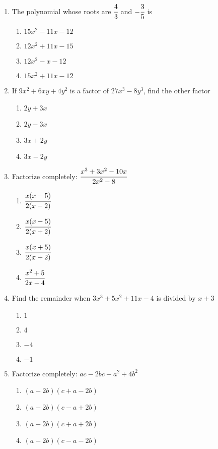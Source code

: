 \begin{multicols}{2}
\begin{enumerate}[label={\arabic*.}]
    \item The polynomial whose roots are \(\cfrac{4}{3}\) and \(-{\cfrac{3}{5}}\) is
      \begin{enumerate}[label={\Alph*.}]
        \item \(15x^2 - 11x -12 \)
        \item \(12x^2 + 11x -15\)
        \item \(12x^2 - x -12\)
        \item \(15x^2 + 11x -12\)
      \end{enumerate}
    \item If \(9x^2 + 6xy + 4y^2\) is a factor of \(27x^3 - 8y^3\), find the other factor
      \begin{enumerate}[label={\Alph*.}]
        \item \(2y + 3x\)
        \item \(2y - 3x\)
        \item \(3x + 2y\)
        \item \(3x - 2y\)
      \end{enumerate}
    \item Factorize completely: \(\cfrac{x^3 + 3x^2 -10x}{2x^2 - 8}\)
      \begin{enumerate}[label={\Alph*.}]
        \item \(\cfrac{x(x-5)}{2(x-2)}\)
        \item \(\cfrac{x(x-5)}{2(x+2)}\)
        \item \(\cfrac{x(x+5)}{2(x+2)}\)
        \item \(\cfrac{x^2 + 5}{2x + 4}\)
      \end{enumerate}
    \item Find the remainder when \(3x^3 + 5x^2 + 11x -4\) is divided by \(x+3\)
      \begin{enumerate}[label={\Alph*.}]
        \item \(1\)
        \item \(4\)
        \item \(-4\)
        \item \(-1\)
      \end{enumerate}
    \item Factorize completely: \(ac -2bc + a^2 + 4b^2\)
      \begin{enumerate}[label={\Alph*.}]
        \item \((a-2b)(c+a-2b)\)
        \item \((a-2b)(c-a+2b)\)
        \item \((a-2b)(c+a+2b)\)
        \item \((a-2b)(c-a-2b)\)

\end{enumerate}
\end{enumerate}
\end{multicols}
